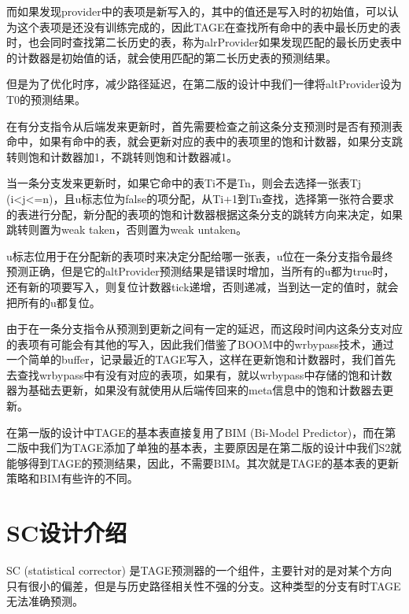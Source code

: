 而如果发现provider中的表项是新写入的，其中的值还是写入时的初始值，可以认为这个表项是还没有训练完成的，因此TAGE在查找所有命中的表中最长历史的表时，也会同时查找第二长历史的表，称为alrProvider如果发现匹配的最长历史表中的计数器是初始值的话，就会使用匹配的第二长历史表的预测结果。

但是为了优化时序，减少路径延迟，在第二版的设计中我们一律将altProvider设为T0的预测结果。


在有分支指令从后端发来更新时，首先需要检查之前这条分支预测时是否有预测表命中，如果有命中的表，就会更新对应的表中的表项里的饱和计数器，如果分支跳转则饱和计数器加1，不跳转则饱和计数器减1。

当一条分支发来更新时，如果它命中的表Ti不是Tn，则会去选择一张表Tj (i<j<=n)，且u标志位为false的项分配，从Ti+1到Tn查找，选择第一张符合要求的表进行分配，新分配的表项的饱和计数器根据这条分支的跳转方向来决定，如果跳转则置为weak taken，否则置为weak untaken。

u标志位用于在分配新的表项时来决定分配给哪一张表，u位在一条分支指令最终预测正确，但是它的altProvider预测结果是错误时增加，当所有的u都为true时，还有新的项要写入，则复位计数器tick递增，否则递减，当到达一定的值时，就会把所有的u都复位。

由于在一条分支指令从预测到更新之间有一定的延迟，而这段时间内这条分支对应的表项有可能会有其他的写入，因此我们借鉴了BOOM中的wrbypass技术，通过一个简单的buffer，记录最近的TAGE写入，这样在更新饱和计数器时，我们首先去查找wrbypass中有没有对应的表项，如果有，就以wrbypass中存储的饱和计数器为基础去更新，如果没有就使用从后端传回来的meta信息中的饱和计数器去更新。

在第一版的设计中TAGE的基本表直接复用了BIM (Bi-Model Predictor)，而在第二版中我们为TAGE添加了单独的基本表，主要原因是在第二版的设计中我们S2就能够得到TAGE的预测结果，因此，不需要BIM。其次就是TAGE的基本表的更新策略和BIM有些许的不同。


\section{SC设计介绍}

SC (statistical corrector) 是TAGE预测器的一个组件，主要针对的是对某个方向只有很小的偏差，但是与历史路径相关性不强的分支\cite{tage-sc-l}。这种类型的分支有时TAGE无法准确预测。

